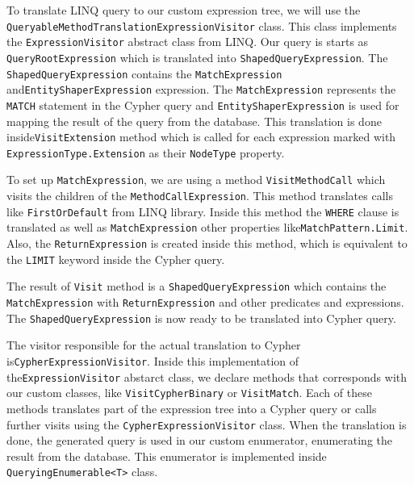 To translate LINQ query to our custom expression tree, we will use the \texttt{QueryableMethodTranslationExpressionVisitor} class.
This class implements the \texttt{ExpressionVisitor} abstract class from LINQ. Our query is starts as \texttt{QueryRootExpression} which is translated into \texttt{ShapedQueryExpression}.
The \texttt{ShapedQueryExpression} contains the \texttt{MatchExpression} and\linebreak\texttt{EntityShaperExpression} expression.
The \texttt{MatchExpression} represents the \texttt{MATCH} statement in the Cypher query and \texttt{EntityShaperExpression} is used for mapping the result of the query from the database.
This translation is done inside\linebreak\texttt{VisitExtension} method which is called for each expression marked with \texttt{ExpressionType.Extension} as their \texttt{NodeType} property.

To set up \texttt{MatchExpression}, we are using a method \texttt{VisitMethodCall} which visits the children of the \texttt{MethodCallExpression}.
This method translates calls like \texttt{FirstOrDefault} from LINQ library.
Inside this method the \texttt{WHERE} clause is translated as well as \texttt{MatchExpression} other properties like\linebreak\texttt{MatchPattern.Limit}.
Also, the \texttt{ReturnExpression} is created inside this method, which is equivalent to the \texttt{LIMIT} keyword inside the Cypher query.

The result of \texttt{Visit} method is a \texttt{ShapedQueryExpression} which contains the \texttt{MatchExpression} with \texttt{ReturnExpression} and other predicates and expressions.
The \texttt{ShapedQueryExpression} is now ready to be translated into Cypher query.

The visitor responsible for the actual translation to Cypher is\linebreak\texttt{CypherExpressionVisitor}.
Inside this implementation of the\linebreak\texttt{ExpressionVisitor} abstarct class, we declare methods that corresponds with our custom classes, like \texttt{VisitCypherBinary} or \texttt{VisitMatch}.
Each of these methods translates part of the expression tree into a Cypher query or calls further visits using the \texttt{CypherExpressionVisitor} class.
When the translation is done, the generated query is used in our custom enumerator, enumerating the result from the database.
This enumerator is implemented inside \texttt{QueryingEnumerable<T>} class.

